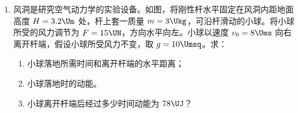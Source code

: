 \documentclass[\gkver]{gaokaozhenti}
\begin{document}
\begin{enumerate}
{(2) 升温前有

$p_{B}=p_{A}+p_{h}$（$p_{h}$ 为汞柱压强），

升温后同样有

$p_{B}' = p_{A}' + p_{h}$，

两式相减可得 $\Delta p_{A} = \Delta p_{B}$。
}

\item
风洞是研究空气动力学的实验设备。如图，将刚性杆水平固定在风洞内距地面高度 $H = 3.2\Um$ 处，杆上套一质量 $m = 3\Ukg$，可沿杆滑动的小球。将小球所受的风力调节为 $F = 15\UN$，方向水平向左。小球以速度 $v_{0} = 8\Ums$ 向右离开杆端，假设小球所受风力不变，取 $g = 10\Umsq$。求：
\begin{enumerate}
	\item
	小球落地所需时间和离开杆端的水平距离；
	\item
	小球落地时的动能。
	\item
	小球离开杆端后经过多少时间动能为 $78\UJ$？
\end{enumerate}
\onepicture[align=right, w=3.45cm]{}
\end{enumerate}
\end{document}
